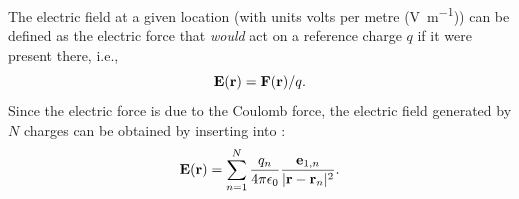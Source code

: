 

\section{}
\label{sec:Basics:Fields} 
The electric field at a given location (with units volts per metre (\si{\volt\per\metre})) can be defined as the electric force that \textit{would} act on a reference charge $q$ if it were present there, i.e.,
\begin{equation}
{\bf E}({\bf r}) = {\bf F}({\bf r})/q.
\label{eq:Basics:E}
\end{equation}
Since the electric force is due to the Coulomb force, the electric field generated by $N$ charges can be obtained by inserting  into :
\begin{equation}
{\bf E}({\bf r}) = \sum_{n=1}^{N}  \frac{q_n}{4\pi \epsilon_0} \frac{{{\bf e}}_{1,n}}{|{\bf r}-{\bf r}_n|^2}.
\label{eq:Basics:CoulombEN}
\end{equation}

